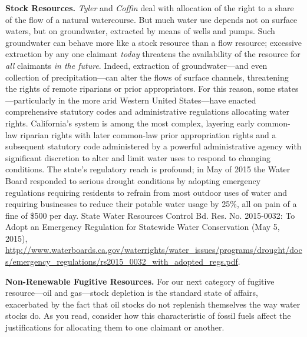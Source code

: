\item \textbf{Stock Resources.} \textit{Tyler} and \textit{Coffin} deal with
allocation of the right to a share of the flow of a natural watercourse. But
much water use depends not on surface waters, but on groundwater, extracted by
means of wells and pumps. Such groundwater can behave more like a stock resource
than a flow resource; excessive extraction by any one claimant \textit{today}
threatens the availability of the resource for \textit{all} claimants \textit{in
the future}. Indeed, extraction of groundwater---and even collection of
precipitation---can alter the flows of surface channels, threatening the rights
of remote riparians or prior appropriators. For this reason, some
states---particularly in the more arid Western United States---have enacted
comprehensive statutory codes and administrative regulations allocating water
rights. California's system is among the most complex, layering early common-law
riparian rights with later common-law prior appropriation rights and a
subsequent statutory code administered by a powerful administrative agency with
significant discretion to alter and limit water uses to respond to changing
conditions. The state's regulatory reach is profound; in May of 2015 the Water
Board responded to serious drought conditions by adopting emergency regulations
requiring residents to refrain from most outdoor uses of water and requiring
businesses to reduce their potable water usage by 25\%, all on pain of a fine of
\$500 per day. State Water Resources Control Bd. Res. No. 2015-0032: To Adopt an
Emergency Regulation for Statewide Water Conservation (May 5, 2015),
\url{http://www.waterboards.ca.gov/waterrights/water_issues/programs/drought/docs/emergency_regulations/rs2015_0032_with_adopted_regs.pdf}.

\item \textbf{Non-Renewable Fugitive Resources.} For our next category of
fugitive resource---oil and gas---stock depletion is the standard state of
affairs, exacerbated by the fact that oil stocks do not replenish themselves the
way water stocks do. As you read, consider how this characteristic of fossil
fuels affect the justifications for allocating them to one claimant or another.


